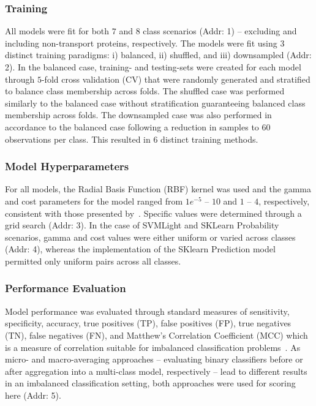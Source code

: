 \subsubsection{Training}
All models were fit for both $7$ and $8$ class scenarios (Addr: 1) -- excluding and including non-transport proteins,
respectively. The models were fit using $3$ distinct training paradigms: i) balanced, ii) shuffled, and iii)
downsampled (Addr: 2). In the balanced case, training- and testing-sets were created for each model through $5$-fold
cross validation (CV) that were randomly generated and stratified to balance class membership across folds. The
shuffled case was performed similarly to the balanced case without stratification guaranteeing balanced class membership
across folds. The downsampled case was also performed in accordance to the balanced case following a reduction in
samples to $60$ observations per class. This resulted in $6$ distinct training methods.

\subsubsection{Model Hyperparameters}
For all models, the Radial Basis Function (RBF) kernel was used and the gamma and cost parameters for the model ranged
from $1e^{-5}$ -- $10$ and $1$ -- $4$, respectively, consistent with those presented by~\cite{mishra2014prediction}.
Specific values were determined through a grid search (Addr: 3). In the case of SVMLight and SKLearn Probability
scenarios, gamma and cost values were either uniform or varied across classes (Addr: 4), whereas the implementation of
the SKlearn Prediction model permitted only uniform pairs across all classes.

\subsubsection{Performance Evaluation}
Model performance was evaluated through standard measures of sensitivity, specificity, accuracy, true positives (TP),
false positives (FP), true negatives (TN), false negatives (FN), and Matthew's Correlation Coefficient (MCC) which is a
measure of correlation suitable for imbalanced classification problems~\cite{mcc2017optimal}. As micro- and
macro-averaging approaches -- evaluating binary classifiers before or after aggregation into a multi-class model,
respectively -- lead to different results in an imbalanced classification setting, both approaches were used for
scoring here (Addr: 5).

